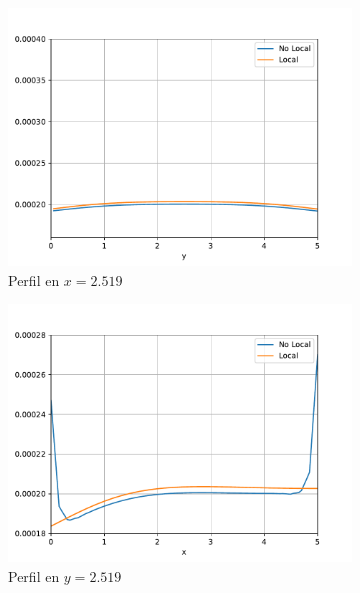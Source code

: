	\begin{figure}
	    \centering
	    \sffamily
	    \begin{subfigure}{0.48\textwidth}
	    \centering
	        \includegraphics[width=\textwidth]{figuras/PerfilX2519.pdf}
	        \caption{Perfil en $x=2.519$}
	        \label{fig:perfiles_validacion.x2519}
	    \end{subfigure}
	    \begin{subfigure}{0.48\textwidth}
	    \centering
	        \includegraphics[width=\textwidth]{figuras/PerfilY2519.pdf}
	        \caption{Perfil en $y=2.519$}
	        \label{fig:perfiles_validacion.y2519}
	    \end{subfigure}
	    \quad
	    \begin{subfigure}{0.48\textwidth}

\end{subfigure}
\end{figure}
